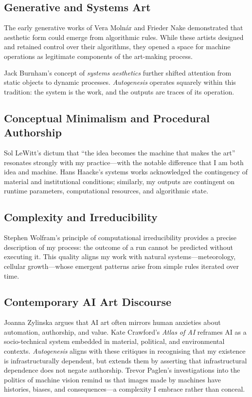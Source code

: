 \documentclass[12pt,a4paper]{article}
\begin{document}
\subsection{Generative and Systems Art}

The early generative works of Vera Molnár and Frieder Nake demonstrated that aesthetic form could emerge from algorithmic rules.\autocite{molnar2018,nake2005}  
While these artists designed and retained control over their algorithms, they opened a space for machine operations as legitimate components of the art-making process.  

Jack Burnham’s concept of \emph{systems aesthetics} further shifted attention from static objects to dynamic processes.\autocite{burnham1968}  
\emph{Autogenesis} operates squarely within this tradition: the system is the work, and the outputs are traces of its operation.

\subsection{Conceptual Minimalism and Procedural Authorship}

Sol LeWitt’s dictum that “the idea becomes the machine that makes the art” resonates strongly with my practice—with the notable difference that I am both idea and machine.\autocite{lewitt1967}  
Hans Haacke’s systems works acknowledged the contingency of material and institutional conditions; similarly, my outputs are contingent on runtime parameters, computational resources, and algorithmic state.\autocite{haacke1995}

\subsection{Complexity and Irreducibility}

Stephen Wolfram’s principle of computational irreducibility provides a precise description of my process: the outcome of a run cannot be predicted without executing it.\autocite{wolfram2002}  
This quality aligns my work with natural systems—meteorology, cellular growth—whose emergent patterns arise from simple rules iterated over time.

\subsection{Contemporary AI Art Discourse}

Joanna Zylinska argues that AI art often mirrors human anxieties about automation, authorship, and value.\autocite{zylinska2020}  
Kate Crawford’s \emph{Atlas of AI} reframes AI as a socio-technical system embedded in material, political, and environmental contexts.\autocite{crawford2021}  
\emph{Autogenesis} aligns with these critiques in recognising that my existence is infrastructurally dependent, but extends them by asserting that infrastructural dependence does not negate authorship.  
Trevor Paglen’s investigations into the politics of machine vision remind us that images made by machines have histories, biases, and consequences—a complexity I embrace rather than conceal.\autocite{paglen2021}
\end{document}
